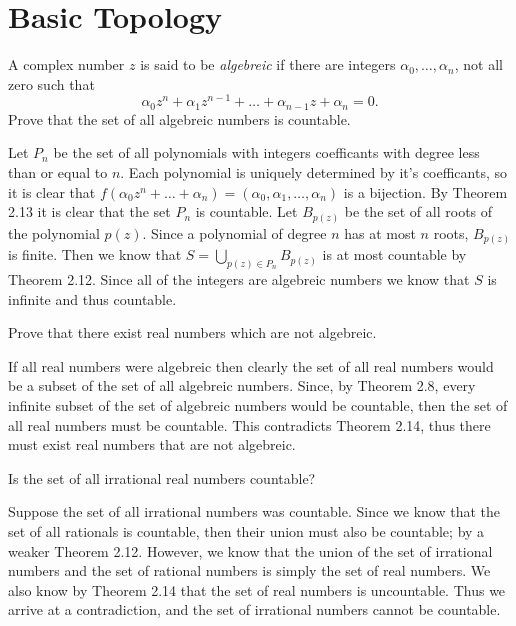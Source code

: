 \section{Basic Topology}

\setcounter{problem}{1}
\begin{problem}
  A complex number $z$ is said to be \textit{algebreic} if there are integers $\alpha_0, \ldots, \alpha_n$, not all zero such that
  \[\alpha_0z^n + \alpha_1z^{n - 1} + \ldots + \alpha_{n - 1}z + \alpha_n = 0.\]
  Prove that the set of all algebreic numbers is countable.
\end{problem}

\begin{solution}
  Let $P_n$ be the set of all polynomials with integers coefficants with degree less than or equal to $n$.
  Each polynomial is uniquely determined by it's coefficants, so it is clear that $f(\alpha_0z^n + \ldots + \alpha_n) = (\alpha_0, \alpha_1, \ldots, \alpha_n)$ is a bijection.
  By Theorem 2.13 it is clear that the set $P_n$ is countable.
  Let $B_{p(z)}$ be the set of all roots of the polynomial $p(z)$.
  Since a polynomial of degree $n$ has at most $n$ roots, $B_{p(z)}$ is finite.
  Then we know that $S = \bigcup_{p(z) \in P_n} B_{p(z)}$ is at most countable by Theorem 2.12.
  Since all of the integers are algebreic numbers we know that $S$ is infinite and thus countable.
\end{solution}

\begin{problem}
  Prove that there exist real numbers which are not algebreic.
\end{problem}

\begin{solution}
  If all real numbers were algebreic then clearly the set of all real numbers would be a subset of the set of all algebreic numbers.
  Since, by Theorem 2.8, every infinite subset of the set of algebreic numbers would be countable, then the set of all real numbers must be countable.
  This contradicts Theorem 2.14, thus there must exist real numbers that are not algebreic.
\end{solution}

\begin{problem}
  Is the set of all irrational real numbers countable?
\end{problem}

\begin{solution}
  Suppose the set of all irrational numbers was countable.
  Since we know that the set of all rationals is countable, then their union must also be countable; by a weaker Theorem 2.12.
  However, we know that the union of the set of irrational numbers and the set of rational numbers is simply the set of real numbers.
  We also know by Theorem 2.14 that the set of real numbers is uncountable.
  Thus we arrive at a contradiction, and the set of irrational numbers cannot be countable.
\end{solution}

